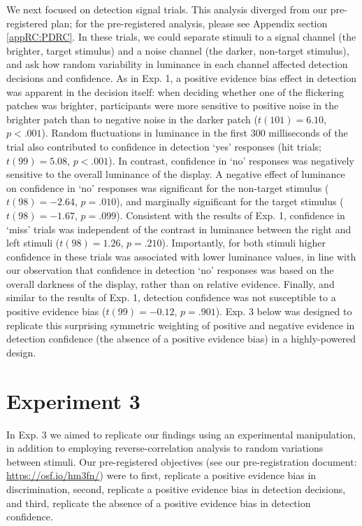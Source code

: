 \documentclass[12pt,twoside]{reedthesis}
\begin{document}
We next focused on detection signal trials. This analysis diverged from our pre-registered plan; for the pre-registered analysis, please see Appendix section \ref{appRC:PDRC}. In these trials, we could separate stimuli to a signal channel (the brighter, target stimulus) and a noise channel (the darker, non-target stimulus), and ask how random variability in luminance in each channel affected detection decisions and confidence. As in Exp. 1, a positive evidence bias effect in detection was apparent in the decision itself: when deciding whether one of the flickering patches was brighter, participants were more sensitive to positive noise in the brighter patch than to negative noise in the darker patch (\(t(101) = 6.10\), \(p < .001\)). Random fluctuations in luminance in the first 300 milliseconds of the trial also contributed to confidence in detection `yes' responses (hit trials; \(t(99) = 5.08\), \(p < .001\)). In contrast, confidence in `no' responses was negatively sensitive to the overall luminance of the display. A negative effect of luminance on confidence in `no' responses was significant for the non-target stimulus (\(t(98) = -2.64\), \(p = .010\)), and marginally significant for the target stimulus (\(t(98) = -1.67\), \(p = .099\)). Consistent with the results of Exp. 1, confidence in `miss' trials was independent of the contrast in luminance between the right and left stimuli (\(t(98) = 1.26\), \(p = .210\)). Importantly, for both stimuli higher confidence in these trials was associated with lower luminance values, in line with our observation that confidence in detection `no' responses was based on the overall darkness of the display, rather than on relative evidence. Finally, and similar to the results of Exp. 1, detection confidence was not susceptible to a positive evidence bias (\(t(99) = -0.12\), \(p = .901\)). Exp. 3 below was designed to replicate this surprising symmetric weighting of positive and negative evidence in detection confidence (the absence of a positive evidence bias) in a highly-powered design.

\hypertarget{experiment-3}{%
\section{Experiment 3}\label{experiment-3}}

In Exp. 3 we aimed to replicate our findings using an experimental manipulation, in addition to employing reverse-correlation analysis to random variations between stimuli. Our pre-registered objectives (see our pre-registration document: \url{https://osf.io/hm3fn/}) were to first, replicate a positive evidence bias in discrimination, second, replicate a positive evidence bias in detection decisions, and third, replicate the absence of a positive evidence bias in detection confidence.
\end{document}
